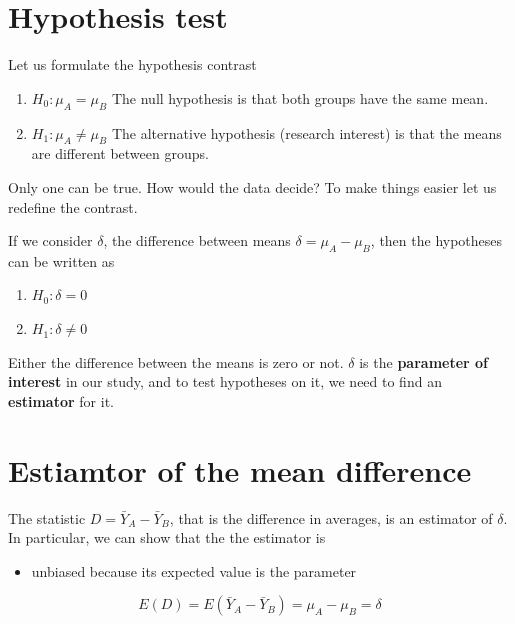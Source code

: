 \documentclass[
]{book}
\providecommand{\tightlist}{%
  \setlength{\itemsep}{0pt}\setlength{\parskip}{0pt}}
\begin{document}
\hypertarget{hypothesis-test}{%
\section{Hypothesis test}\label{hypothesis-test}}

Let us formulate the hypothesis contrast

\begin{enumerate}
\def\labelenumi{\alph{enumi}.}
\item
  \(H_0: \mu_A=\mu_B\) The null hypothesis is that both groups have the same mean.
\item
  \(H_1: \mu_A \neq \mu_B\) The alternative hypothesis (research interest) is that the means are different between groups.
\end{enumerate}

Only one can be true. How would the data decide? To make things easier let us redefine the contrast.

If we consider \(\delta\), the difference between means \(\delta=\mu_A-\mu_B\), then the hypotheses can be written as

\begin{enumerate}
\def\labelenumi{\alph{enumi}.}
\tightlist
\item
  \(H_0: \delta=0\)
\item
  \(H_1: \delta\neq 0\)
\end{enumerate}

Either the difference between the means is zero or not. \(\delta\) is the \textbf{parameter of interest} in our study, and to test hypotheses on it, we need to find an \textbf{estimator} for it.

\hypertarget{estiamtor-of-the-mean-difference}{%
\section{Estiamtor of the mean difference}\label{estiamtor-of-the-mean-difference}}

The statistic \(D=\bar{Y}_A-\bar{Y}_B\), that is the difference in averages, is an estimator of \(\delta\). In particular, we can show that the the estimator is

\begin{itemize}
\tightlist
\item
  unbiased because its expected value is the parameter
\end{itemize}

\[E(D)=E(\bar{Y}_A-\bar{Y}_B)=\mu_A-\mu_B=\delta\]
\end{document}
